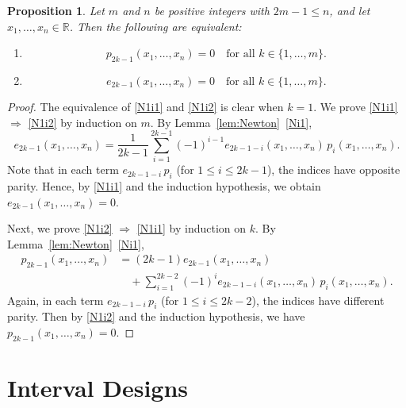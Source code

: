 \documentclass[11pt]{amsart}
\newtheorem{prop}[thm]{Proposition}
\theoremstyle{definition}
\newcommand{\R}{\mathbb{R}}
\begin{document}
\begin{prop}
\label{prop:Newton1}
Let \( m \) and \( n \) be positive integers with \( 2m-1 \le n \), and let \( x_1,\ldots,x_n \in \R \). Then the following are equivalent:
\begin{enumerate}
\item\label{N1i1} 
\[
p_{2k-1}(x_1,\ldots,x_n) = 0 \quad \text{for all } k\in\{1,\dots,m\}.
\]
\item\label{N1i2}
\[
e_{2k-1}(x_1,\ldots,x_n) = 0 \quad \text{for all } k\in\{1,\dots,m\}.
\]
\end{enumerate}
\end{prop}
\begin{proof}
The equivalence of \ref{N1i1} and \ref{N1i2} is clear when \( k=1 \). We prove \ref{N1i1} $\Rightarrow$ \ref{N1i2} by induction on \( m \). By Lemma~\ref{lem:Newton}~\ref{Ni1},
\[
e_{2k-1}(x_1,\ldots,x_n) = \frac{1}{2k-1} \sum_{i=1}^{2k-1} (-1)^{i-1} e_{2k-1-i}(x_1,\ldots,x_n) \, p_i(x_1,\ldots,x_n).
\]
Note that in each term \( e_{2k-1-i}\, p_i \) (for \( 1 \le i \le 2k-1 \)), the indices have opposite parity. Hence, by  \ref{N1i1} and the induction hypothesis, we obtain \( e_{2k-1}(x_1,\ldots,x_n)=0 \).

Next, we prove \ref{N1i2} $\Rightarrow$ \ref{N1i1} by induction on \( k \). By Lemma~\ref{lem:Newton}~\ref{Ni1},
\begin{align*}
p_{2k-1}(x_1,\ldots,x_n) &= 
(2k-1)e_{2k-1}(x_1,\ldots,x_n) 
\\&\quad+ \sum_{i=1}^{2k-2} (-1)^{i} e_{2k-1-i}(x_1,\ldots,x_n) \, p_i(x_1,\ldots,x_n).
\end{align*}
Again, in each term \( e_{2k-1-i}\, p_i \) (for \( 1 \le i \le 2k-2 \)), the indices have different parity. Then by \ref{N1i2} and the induction hypothesis, we have \( p_{2k-1}(x_1,\ldots,x_n)=0 \).
\end{proof}

\section{Interval Designs}\label{sec:3}
\end{document}
